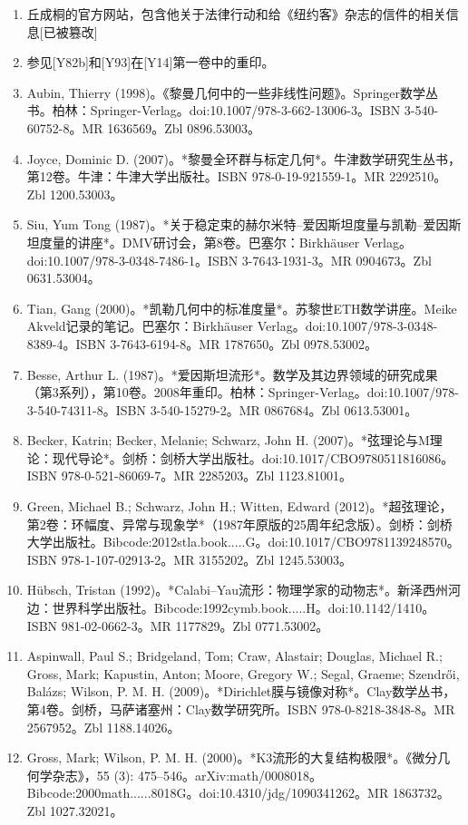 \begin{enumerate}
\item 丘成桐的官方网站，包含他关于法律行动和给《纽约客》杂志的信件的相关信息[已被篡改]  
\item 参见[Y82b]和[Y93]在[Y14]第一卷中的重印。  
\item Aubin, Thierry (1998)。《黎曼几何中的一些非线性问题》。Springer数学丛书。柏林：Springer-Verlag。doi:10.1007/978-3-662-13006-3。ISBN 3-540-60752-8。MR 1636569。Zbl 0896.53003。
\item Joyce, Dominic D. (2007)。*黎曼全环群与标定几何*。牛津数学研究生丛书，第12卷。牛津：牛津大学出版社。ISBN 978-0-19-921559-1。MR 2292510。Zbl 1200.53003。  
\item Siu, Yum Tong (1987)。*关于稳定束的赫尔米特–爱因斯坦度量与凯勒–爱因斯坦度量的讲座*。DMV研讨会，第8卷。巴塞尔：Birkhäuser Verlag。doi:10.1007/978-3-0348-7486-1。ISBN 3-7643-1931-3。MR 0904673。Zbl 0631.53004。  
\item Tian, Gang (2000)。*凯勒几何中的标准度量*。苏黎世ETH数学讲座。Meike Akveld记录的笔记。巴塞尔：Birkhäuser Verlag。doi:10.1007/978-3-0348-8389-4。ISBN 3-7643-6194-8。MR 1787650。Zbl 0978.53002。  
\item Besse, Arthur L. (1987)。*爱因斯坦流形*。数学及其边界领域的研究成果（第3系列），第10卷。2008年重印。柏林：Springer-Verlag。doi:10.1007/978-3-540-74311-8。ISBN 3-540-15279-2。MR 0867684。Zbl 0613.53001。
\item Becker, Katrin; Becker, Melanie; Schwarz, John H. (2007)。*弦理论与M理论：现代导论*。剑桥：剑桥大学出版社。doi:10.1017/CBO9780511816086。ISBN 978-0-521-86069-7。MR 2285203。Zbl 1123.81001。  
\item Green, Michael B.; Schwarz, John H.; Witten, Edward (2012)。*超弦理论，第2卷：环幅度、异常与现象学*（1987年原版的25周年纪念版）。剑桥：剑桥大学出版社。Bibcode:2012stla.book.....G。doi:10.1017/CBO9781139248570。ISBN 978-1-107-02913-2。MR 3155202。Zbl 1245.53003。  
\item Hübsch, Tristan (1992)。*Calabi–Yau流形：物理学家的动物志*。新泽西州河边：世界科学出版社。Bibcode:1992cymb.book.....H。doi:10.1142/1410。ISBN 981-02-0662-3。MR 1177829。Zbl 0771.53002。  
\item Aspinwall, Paul S.; Bridgeland, Tom; Craw, Alastair; Douglas, Michael R.; Gross, Mark; Kapustin, Anton; Moore, Gregory W.; Segal, Graeme; Szendrői, Balázs; Wilson, P. M. H. (2009)。*Dirichlet膜与镜像对称*。Clay数学丛书，第4卷。剑桥，马萨诸塞州：Clay数学研究所。ISBN 978-0-8218-3848-8。MR 2567952。Zbl 1188.14026。
\item Gross, Mark; Wilson, P. M. H. (2000)。*K3流形的大复结构极限*。《微分几何学杂志》，55 (3): 475–546。arXiv:math/0008018。Bibcode:2000math......8018G。doi:10.4310/jdg/1090341262。MR 1863732。Zbl 1027.32021。  

\end{enumerate}
